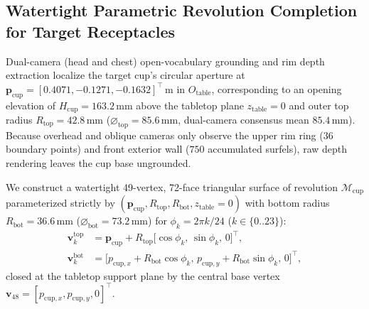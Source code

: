 \documentclass[10pt,journal]{IEEEtran}
\begin{document}
\subsection{Watertight Parametric Revolution Completion for Target Receptacles}
Dual-camera (head and chest) open-vocabulary grounding and rim depth extraction localize the target cup's circular aperture at $\mathbf{p}_{\mathrm{cup}} = [0.4071, -0.1271, -0.1632]^\top\,\mathrm{m}$ in $O_{\mathrm{table}}$, corresponding to an opening elevation of $H_{\mathrm{cup}} = 163.2\,\mathrm{mm}$ above the tabletop plane $z_{\mathrm{table}}=0$ and outer top radius $R_{\mathrm{top}} = 42.8\,\mathrm{mm}$ ($\varnothing_{\mathrm{top}} = 85.6\,\mathrm{mm}$, dual-camera consensus mean $85.4\,\mathrm{mm}$). Because overhead and oblique cameras only observe the upper rim ring ($36$ boundary points) and front exterior wall ($750$ accumulated surfels), raw depth rendering leaves the cup base ungrounded.

We construct a watertight 49-vertex, 72-face triangular surface of revolution $\mathcal{M}_{\mathrm{cup}}$ parameterized strictly by $(\mathbf{p}_{\mathrm{cup}}, R_{\mathrm{top}}, R_{\mathrm{bot}}, z_{\mathrm{table}}=0)$ with bottom radius $R_{\mathrm{bot}} = 36.6\,\mathrm{mm}$ ($\varnothing_{\mathrm{bot}} = 73.2\,\mathrm{mm}$) for $\phi_k = 2\pi k / 24$ ($k \in \{0..23\}$):
\begin{equation}
\begin{aligned}
    \mathbf{v}_k^{\mathrm{top}} &= \mathbf{p}_{\mathrm{cup}} + R_{\mathrm{top}}\big[\cos\phi_k,\, \sin\phi_k,\, 0\big]^\top, \\
    \mathbf{v}_k^{\mathrm{bot}} &= \big[p_{\mathrm{cup},x} + R_{\mathrm{bot}}\cos\phi_k,\, p_{\mathrm{cup},y} + R_{\mathrm{bot}}\sin\phi_k,\, 0\big]^\top,
\end{aligned}
\label{eq:cup_revolution}
\end{equation}
closed at the tabletop support plane by the central base vertex $\mathbf{v}_{48} = [p_{\mathrm{cup},x}, p_{\mathrm{cup},y}, 0]^\top$.
\end{document}
